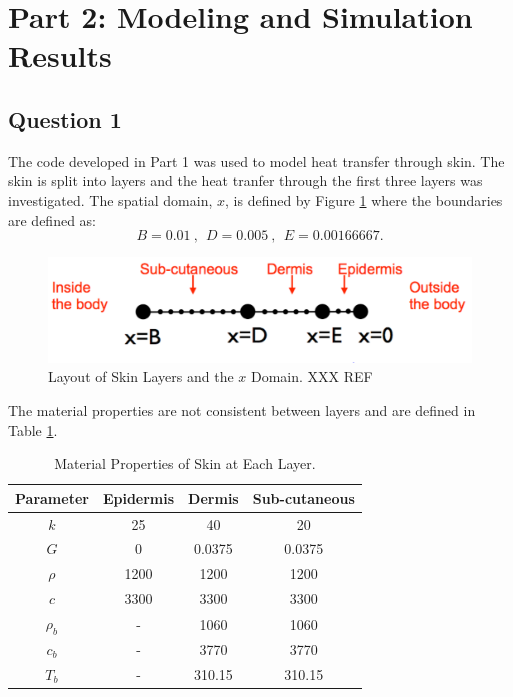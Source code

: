 \documentclass[11pt]{article}
\newcommand{\ra}[1]{\renewcommand{\arraystretch}{#1}}
\begin{document}
\section{Part 2: Modeling and Simulation Results}

\subsection{Question 1}

The code developed in Part 1 was used to model heat transfer through skin. The skin is split into layers and the heat tranfer through the first three layers was investigated. The spatial domain, $x$, is defined by Figure \ref{fig:skinlayers} where the boundaries are defined as:
\begin{equation*}
 B = 0.01 \ , \ \ D = 0.005 \ , \ \ E  =  0.00166667.
\end{equation*}

\begin{figure}[!h]  %
	\centering
	\includegraphics[width=.75\textwidth]{SkinStructure.png}
    \caption{Layout of Skin Layers and the $x$ Domain. XXX REF}\label{fig:skinlayers}
\end{figure}

The material properties are not consistent between layers and are defined in Table \ref{table:defparams}.
\FloatBarrier
\begin{table}[!h]
\centering %
\ra{1.3}
\begin{tabular}{@{}cccc@{}}\toprule
 \textbf{Parameter}  & \textbf{Epidermis} &  \textbf{Dermis} & \textbf{Sub-cutaneous} \\
\midrule
$ k$ & 25  &  40  & 20 \\
$G$ & 0  & 0.0375  & 0.0375 \\
$\rho$ & 1200  &  1200  &  1200 \\
$c$ & 3300 & 3300  & 3300 \\
$\rho_b$ & -  & 1060  & 1060 \\
$c_b$ & -  & 3770  &  3770\\
$T_b$  & - & 310.15  &  310.15  \\
\bottomrule
\end{tabular}
\caption{Material Properties of Skin at Each Layer.}
\label{table:defparams}
\end{table}
\FloatBarrier
\end{document}
